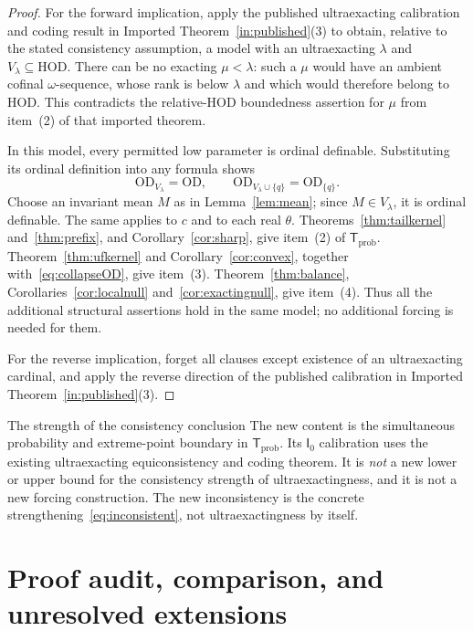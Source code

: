 \documentclass[11pt,letterpaper]{article}
\theoremstyle{definition}
\newcommand{\OD}{\mathrm{OD}}
\newcommand{\HOD}{\mathrm{HOD}}
\newcommand{\Izero}{\mathsf I_0}
\newcommand{\ODlam}{\OD_{V_\lambda}}
\newcommand{\ODq}{\OD_{V_\lambda\cup\{q\}}}
\begin{document}
\begin{proof}
For the forward implication, apply the published ultraexacting calibration and coding result in Imported Theorem~\ref{in:published}(3) to obtain, relative to the stated consistency assumption, a model with an ultraexacting $\lambda$ and $V_\lambda\subseteq\HOD$. There can be no exacting $\mu<\lambda$: such a $\mu$ would have an ambient cofinal $\omega$-sequence, whose rank is below $\lambda$ and which would therefore belong to $\HOD$. This contradicts the relative-HOD boundedness assertion for $\mu$ from item~(2) of that imported theorem.

In this model, every permitted low parameter is ordinal definable. Substituting its ordinal definition into any formula shows
\begin{equation}\label{eq:collapseOD}
 \ODlam=\OD,
 \qquad \ODq=\OD_{\{q\}}.
\end{equation}
Choose an invariant mean $M$ as in Lemma~\ref{lem:mean}; since $M\in V_\lambda$, it is ordinal definable. The same applies to $c$ and to each real $\theta$. Theorems~\ref{thm:tailkernel} and~\ref{thm:prefix}, and Corollary~\ref{cor:sharp}, give item~(2) of $\mathsf T_{\mathrm{prob}}$. Theorem~\ref{thm:ufkernel} and Corollary~\ref{cor:convex}, together with~\eqref{eq:collapseOD}, give item~(3). Theorem~\ref{thm:balance}, Corollaries~\ref{cor:localnull} and~\ref{cor:exactingnull}, give item~(4). Thus all the additional structural assertions hold in the same model; no additional forcing is needed for them.

For the reverse implication, forget all clauses except existence of an ultraexacting cardinal, and apply the reverse direction of the published calibration in Imported Theorem~\ref{in:published}(3).
\end{proof}

\begin{assessment}{The strength of the consistency conclusion}
The new content is the simultaneous probability and extreme-point boundary in $\mathsf T_{\mathrm{prob}}$. Its $\Izero$ calibration uses the existing ultraexacting equiconsistency and coding theorem. It is \emph{not} a new lower or upper bound for the consistency strength of ultraexactingness, and it is not a new forcing construction. The new inconsistency is the concrete strengthening~\eqref{eq:inconsistent}, not ultraexactingness by itself.
\end{assessment}

\section{Proof audit, comparison, and unresolved extensions}\label{sec:audit}
\end{document}
